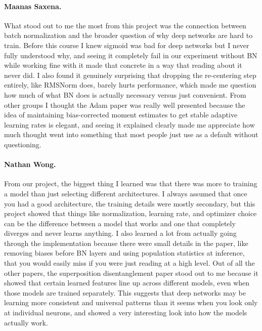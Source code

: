 \documentclass{article}
\begin{document}
\paragraph{Maanas Saxena.}
What stood out to me the most from this project was the connection between batch 
normalization and the broader question of why deep networks are hard to train. Before 
this course I knew sigmoid was bad for deep networks but I never fully understood why, 
and seeing it completely fail in our experiment without BN while working fine with it 
made that concrete in a way that reading about it never did. I also found it genuinely 
surprising that dropping the re-centering step entirely, like RMSNorm does, barely 
hurts performance, which made me question how much of what BN does is actually 
necessary versus just convenient. From other groups I thought the Adam paper was 
really well presented because the idea of maintaining bias-corrected moment estimates 
to get stable adaptive learning rates is elegant, and seeing it explained clearly made 
me appreciate how much thought went into something that most people just use as a 
default without questioning.

\paragraph{Nathan Wong.}
From our project, the biggest thing I learned was that there was more to training a 
model than just selecting different architectures. I always assumed that once you had 
a good architecture, the training details were mostly secondary, but this project showed 
that things like normalization, learning rate, and optimizer choice can be the 
difference between a model that works and one that completely diverges and never 
learns anything. I also learned a lot from actually going through the implementation 
because there were small details in the paper, like removing biases before BN layers 
and using population statistics at inference, that you would easily miss if you were 
just reading at a high level. Out of all the other papers, the superposition disentanglement paper stood out to me because it showed that certain learned features line up across different models, even when those models are trained separately. This suggests that deep networks may be learning more consistent and universal patterns than it seems when you look only at individual neurons, and showed a very interesting look into how the models actually work.


\end{document}
